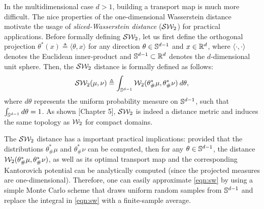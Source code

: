 In the multidimensional case $d > 1$, building a transport map is much more difficult. The nice properties of the one-dimensional Wasserstein distance motivate the usage of \emph{sliced-Wasserstein distance} (${\cal S}{\cal W}_2$) for practical applications. Before formally defining ${\cal S}{\cal W}_2$, let us first define the orthogonal projection $\theta^* (x) \triangleq \langle \theta, x \rangle$ for any direction $\theta \in \mathbb{S}^{d-1}$ and $x \in \mathbb{R}^d$, where $\langle \cdot, \cdot \rangle$ denotes the Euclidean inner-product and $\mathbb{S}^{d-1} \subset \mathbb{R}^d$ denotes the $d$-dimensional unit sphere. Then, the ${\cal S}{\cal W}_2$ distance is formally defined as follows:
\begin{align}
{\cal S}{\cal W}_2(\mu,\nu) \triangleq \int_{\mathbb{S}^{d-1}} {\cal W}_2 (\theta^*_\#\mu, \theta^*_\#\nu) \> d \theta, \label{eqn:sw}
\end{align}
where $d\theta$ represents the uniform probability measure on $\mathbb{S}^{d-1}$, such that $\int_{\mathbb{S}^{d-1}} d \theta = 1$. As shown \cite{bonnotte2013unidimensional}[Chapter 5], ${\cal S}{\cal W}_2$ is indeed a distance metric and induces the same topology as ${\cal W}_2$ for compact domains.

The ${\cal S}{\cal W}_2$ distance has a important practical implications: provided that the distributions $\theta^*_\#\mu$ and $\theta^*_\#\nu$ can be computed, then for any $\theta \in \mathbb{S}^{d-1}$, the distance ${\cal W}_2 (\theta^*_\#\mu, \theta^*_\#\nu)$, as well as its optimal transport map and the corresponding Kantorovich potential can be analytically computed (since the projected measures are one-dimensional). Therefore, one can easily approximate \eqref{eqn:sw} by using a simple Monte Carlo scheme that draws uniform random samples from $\mathbb{S}^{d-1}$ and replace the integral in \eqref{eqn:sw} with a finite-sample average.

